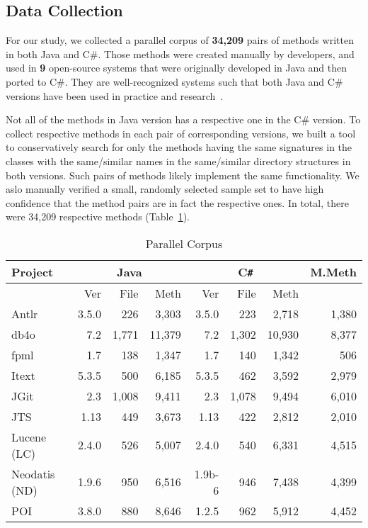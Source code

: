 \subsection{Data Collection}

For our study, we collected a parallel corpus of \textbf{34,209} pairs of
methods written in both Java and C\#. Those methods were created
manually by developers, and used in \textbf{9} open-source systems
that were originally developed in Java and then ported to C\#. They
are well-recognized systems such that both Java and C\# versions have
been used in practice and research~\cite{ase15}.

Not all of the methods in Java version has a respective one in the C\#
version. To collect respective methods in each pair of corresponding
versions, we built a tool to conservatively search for only the
methods having the same signatures in the classes with the
same/similar names in the same/similar directory structures in both
versions. Such pairs of methods likely implement the same
functionality. We aslo manually verified a small, randomly selected
sample set to have high confidence that the method pairs are in fact
the respective ones. In total, there were 34,209 respective methods
(Table~\ref{tab:systems}).

\begin{table}[t]
       \small
	\tabcolsep 3pt
  \centering
  \caption{Parallel Corpus}
    \begin{tabular}{l|rrr|rrr|r}
    \toprule
    Project & \multicolumn{3}{c}{Java} \vline& \multicolumn{3}{c}{C\texttt{\#}} \vline& M.Meth \\
    \hline
		& Ver   &File 		&Meth 	&Ver 			&File 		&Meth 		&  \\
		\hline					
    Antlr~\cite{Antlr} 		   & 3.5.0 & 226   	& 3,303  & 3.5.0 	& 223   	& 2,718  	& 1,380 \\
    db4o~\cite{db4o}  		   & 7.2   & 1,771 	& 11,379 & 7.2   	& 1,302  	& 10,930 	& 8,377 \\
    fpml~\cite{fpml}  		   & 1.7   & 138   	& 1,347  & 1.7   	& 140   	& 1,342  	& 506 \\
    Itext~\cite{Itext} 		   & 5.3.5 & 500   	& 6,185  & 5.3.5 	& 462   	& 3,592  	& 2,979 \\
    JGit~\cite{JGit}  		   & 2.3   & 1,008 	& 9,411  & 2.3   	& 1,078  	& 9,494  	& 6,010 \\
    JTS~\cite{JTS}   		   & 1.13  & 449   	& 3,673  & 1.13  	& 422   	& 2,812  	& 2,010 \\
    Lucene (LC)~\cite{Lucene}  	   & 2.4.0 & 526   	& 5,007  & 2.4.0 	& 540   	& 6,331  	& 4,515 \\
    Neodatis (ND)~\cite{Neodatis}       & 1.9.6 & 950   	& 6,516  & 1.9b-6       & 946           & 7,438 	& 4,399 \\
    POI~\cite{POI}   		   & 3.8.0 & 880        & 8,646  & 1.2.5 	& 962   	& 5,912  	& 4,452 \\
    \bottomrule
    \end{tabular}%
  \label{tab:systems}%
\end{table}%

